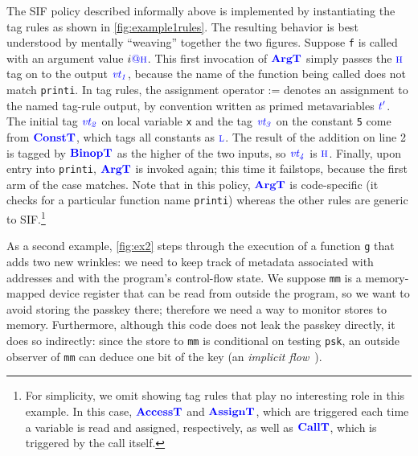 \documentclass{llncs}
\begin{document}
The SIF policy described informally above is implemented by instantiating the
tag rules as shown in \cref{fig:example1rules}.  The resulting behavior is best understood
by mentally ``weaving'' together the two figures.
Suppose {\tt f} is called with an argument value \(i \tagat \high\).
This first invocation of \(\argtname\) simply passes the \(\high\) tag on to the output \(\vt[_1]\),
because the name of the function being called does not match {\tt printi}. 
In tag rules, the assignment operator := denotes an assignment to the named tag-rule output, by convention
written as primed metavariables \(\gentag[']\).
The initial tag \(\vt[_2]\) on local variable {\tt x} and the tag \(\vt[_3]\) on the constant {\tt 5}
come from \(\consttname\), which tags all constants as \(\low\).
The result of the addition on line 2 is tagged by \(\binoptname\) as the
higher of the two inputs, so \(\vt[_4]\) is \(\high\). Finally, upon entry into {\tt printi}, \(\argtname\)
is invoked again; this time it failstops, because the first arm of the case matches.
Note that in this policy, \(\argtname\) is code-specific (it checks for a particular function name {\tt printi})
whereas the other rules are generic to SIF.\footnote{
For simplicity, we omit showing tag rules that play no interesting role in this example.
In this case, \(\accesstname\) and \(\assigntname\), 
which are triggered each time a variable is read and assigned, respectively,
as well as \(\calltname\), which is triggered by the call itself.}

As a second example, \cref{fig:ex2} steps through the execution of a function {\tt g} that adds two new wrinkles:
we need to keep track of metadata associated with
addresses and with the program's control-flow state. We suppose {\tt mm} is
a memory-mapped device register that can be read from outside the program, so we want to avoid storing the passkey there;
therefore we need a way to monitor stores to memory.  Furthermore, although this code does not leak the passkey directly,
it does so indirectly: since the store to {\tt mm} is conditional on testing {\tt psk},
an outside observer of {\tt mm} can deduce one bit of the key (an {\em implicit flow}~\cite{Denning76:SFIlattice}).
\end{document}
